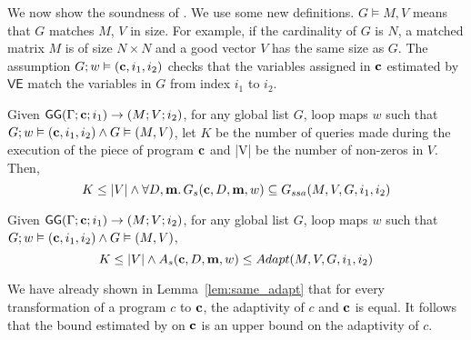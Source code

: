 We now show the soundness of {\THESYSTEM}. We use some new definitions. $G \vDash M, V$ means that $G$ matches $M$, $V$ in size. For example, if the cardinality of $G$ is $N$, a matched matrix $M$ is of size $N\times N$ and a good vector $V$ has the same size as $G$. The assumption $G; w \vDash ({\bf{{c}}}, i_1,i_2)$ checks that the variables assigned in ${\bf{{c}}}$ estimated by $\mathsf{VE}$ match the variables in $G$ from index $i_1$ to $i_2$.

\begin{thm}
Given $ \mathsf{GG}{(\Gamma; {\bf{{c}}}; i_1 )}\to {(M; V;i_2)}$,  for any global list $G$,  loop maps $w$ such that $G ;w \vDash ({\bf{{c}}}, i_1, i_2) \land G \vDash (M,V)$, let $K$ be the number of queries made during the execution of the piece of program ${\bf{{c}}}$ and |V| be the number of non-zeros in $V$. 
Then,
\[
K \leq |V| \land \forall D, {\bf{{m}}}.\, G_{s}({\bf{{c}}},D,{\bf{{m}}},w) \subseteq G_{ssa}(M, V,G,i_1, i_2)
\]      
\end{thm}

\begin{coro}
Given $ \mathsf{GG}{(\Gamma; {\bf{{c}}}; i_1 )}\to {(M; V;i_2)}$,  for any global list $G$,  loop maps $w$ such that $G ;w \vDash ({\bf{{c}}}, i_1, i_2) \land G \vDash (M,V)$,
\[
K \leq |V| \land A_s({\bf{{c}}}, D, {\bf{{m}}}, w) \leq Adapt(M, V,G,i_1, i_2)
\]      
\end{coro}
We have already shown in Lemma~\ref{lem:same_adapt} that for every transformation of a program $c$ to ${\bf{{c}}}$, the adaptivity of $c$ and ${\bf{{c}}}$ is equal. It follows that the bound estimated by {\THESYSTEM} on ${\bf{{c}}}$ is an upper bound on the adaptivity of $c$.  

